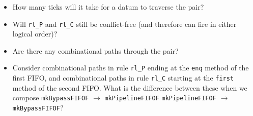 \begin{itemize}

 \item How many ticks will it take for a datum to traverse the pair?

 \item Will \verb|rl_P| and \verb|rl_C| still be conflict-free (and
       therefore can fire in either logical order)?

 \item Are there any combinational paths through the pair?

 \item Consider combinational paths in rule \verb|rl_P| ending at the
       \verb|enq| method of the first FIFO, and combinational paths in
       rule \verb|rl_C| starting at the \verb|first| method of the
       second FIFO.  What is the difference between these when we
       compose \verb|mkBypassFIFOF| $\longrightarrow$ \verb|mkPipelineFIFOF|
       {\vs} \verb|mkPipelineFIFOF| $\longrightarrow$ \verb|mkBypassFIFOF|?

\end{itemize}





